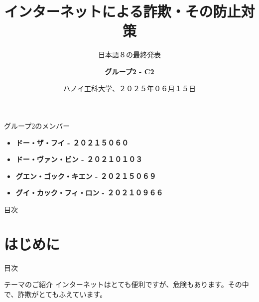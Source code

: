 \documentclass[xcolor=dvipsnames, aspectratio=1610]{beamer}
\title[インターネットによる詐欺・その防止対策]{\Huge インターネットによる詐欺・その防止対策}
\subtitle{\large 日本語８の最終発表}
\author[グループ２ - C2]{\LARGE \textbf{グループ2 - C2}}
\institute[日本語８]{\Large 日本語８}
\date[\today]{\large ハノイ工科大学、２０２５年０６月１５日}
\begin{document}
\begin{frame}
\maketitle
\end{frame}

\begin{frame}{グループ2のメンバー}
    \LARGE
    \begin{itemize}
        \item \textbf{ドー・ザ・フイ - ２０２１５０６０}
        \item \textbf{ドー・ヴァン・ビン - ２０２１０１０３}
        \item \textbf{グエン・ゴック・キエン - ２０２１５０６９}
        \item \textbf{グイ・カック・フィ・ロン - ２０２１０９６６}
    \end{itemize}
\end{frame}

\begin{frame}{目次}
    \tableofcontents
\end{frame}

\section{はじめに}
\begin{frame}{目次}
\end{frame}
\begin{frame}{テーマのご紹介}
    インターネットはとても便利ですが、危険もあります。その中で、詐欺がとてもふえています。
    \vspace{0.3cm}
    \begin{figure}[h]
        \centering
    \end{figure}
\end{frame}
\end{document}
